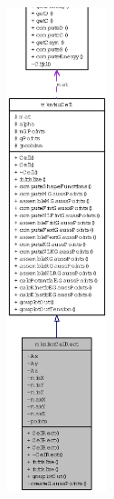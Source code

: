 \begin{figure}[H]
\begin{center}
\leavevmode
\includegraphics[height=400pt]{classmknix_1_1CellRect__coll__graph}
\end{center}
\end{figure}
